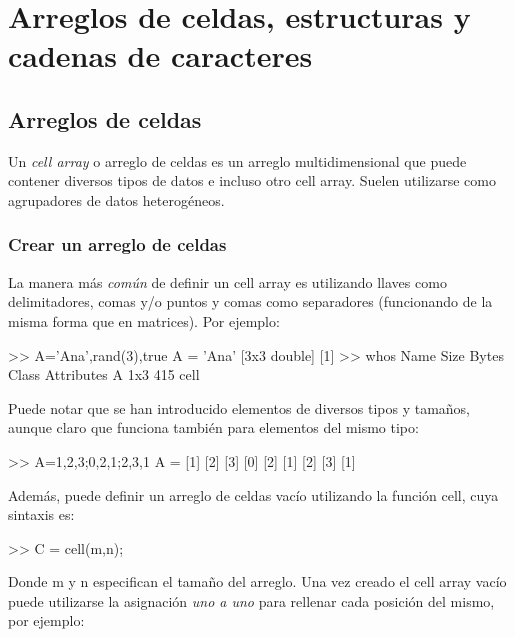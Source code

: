 \chapter{Arreglos de celdas, estructuras y cadenas de caracteres}\label{arreglos-de-celdas-estructuras-y-cadenas-de-caracteres}

\section{Arreglos de celdas}\label{arreglos-de-celdas}

Un \emph{cell array} o arreglo de celdas es un arreglo multidimensional
que puede contener diversos tipos de datos e incluso otro cell array.
Suelen utilizarse como agrupadores de datos heterogéneos.

\subsection{Crear un arreglo de celdas}\label{crear-un-arreglo-de-celdas}

La manera más \emph{común} de definir un cell array es utilizando llaves
como delimitadores, comas y/o puntos y comas como separadores
(funcionando de la misma forma que en matrices). Por ejemplo:

\begin{matlab}
>> A={'Ana',rand(3),true}
A = 
    'Ana'    [3x3 double]    [1]
>> whos
  Name      Size            Bytes  Class    Attributes
  A         1x3               415  cell     
\end{matlab}

Puede notar que se han introducido elementos de diversos tipos y
tamaños, aunque claro que funciona también para elementos del mismo
tipo:

\begin{matlab}
>> A={1,2,3;0,2,1;2,3,1}
A = 
    [1]    [2]    [3]
    [0]    [2]    [1]
    [2]    [3]    [1]
\end{matlab}

Además, puede definir un arreglo de celdas vacío utilizando la función
cell, cuya sintaxis es:

\begin{matlab}
>> C = cell(m,n);
\end{matlab}

Donde m y n especifican el tamaño del arreglo. Una vez creado el cell
array vacío puede utilizarse la asignación \emph{uno a uno} para
rellenar cada posición del mismo, por ejemplo:

